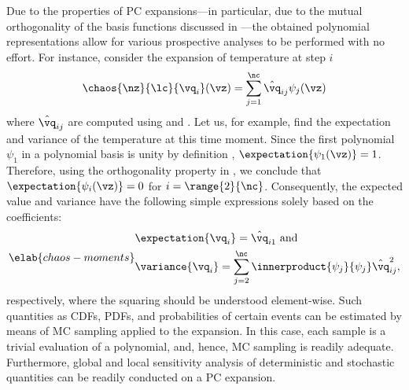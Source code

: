 Due to the properties of \ac{PC} expansions---in particular, due to the mutual
orthogonality of the basis functions discussed in ---the
obtained polynomial representations allow for various prospective analyses to be
performed with no effort. For instance, consider the expansion of temperature at
step $i$
\[
  \chaos{\nz}{\lc}{\vq_i}(\vz) = \sum_{j = 1}^{\nc} \hat{\vq}_{ij} \psi_j(\vz)
\]
where $\hat{\vq}_{ij}$ are computed using  and
. Let us, for example, find the expectation and
variance of the temperature at this time moment. Since the first polynomial
$\psi_1$ in a polynomial basis is unity by definition \cite{xiu2010},
$\expectation{\psi_1(\vz)} = 1$. Therefore, using the orthogonality property in
, we conclude that $\expectation{\psi_i(\vz)} =
0$ for $i = \range{2}{\nc}$. Consequently, the expected value and variance have
the following simple expressions solely based on the coefficients:
\begin{equation} \elab{chaos-moments}
  \begin{split}
    & \expectation{\vq_i} = \hat{\vq}_{i1} \text{ and} \\
    & \variance{\vq_i} = \sum_{j = 2}^{\nc} \innerproduct{\psi_j}{\psi_j} \hat{\vq}_{ij}^2,
  \end{split}
\end{equation}
respectively, where the squaring should be understood element-wise. Such
quantities as \acp{CDF}, \acp{PDF}, and probabilities of certain events can be
estimated by means of \ac{MC} sampling applied to the expansion. In this case,
each sample is a trivial evaluation of a polynomial, and, hence, \ac{MC}
sampling is readily adequate. Furthermore, global and local sensitivity analysis
of deterministic and stochastic quantities can be readily conducted on a \ac{PC}
expansion.
